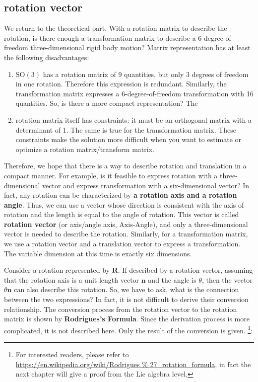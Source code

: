 \subsection{rotation vector}

We return to the theoretical part. With a rotation matrix to describe the rotation, is there enough a transformation matrix to describe a 6-degree-of-freedom three-dimensional rigid body motion? Matrix representation has at least the following disadvantages:

\begin{enumerate}
	\item  $ \mathrm {SO}( 3 ) $ has a rotation matrix of 9 quantities, but only 3 degrees of freedom in one rotation. Therefore this expression is redundant. Similarly, the transformation matrix expresses a 6-degree-of-freedom transformation with 16 quantities. So, is there a more compact representation?
	The \item rotation matrix itself has constraints: it must be an orthogonal matrix with a determinant of 1. The same is true for the transformation matrix. These constraints make the solution more difficult when you want to estimate or optimize a rotation matrix/transform matrix.
\end{enumerate}

Therefore, we hope that there is a way to describe rotation and translation in a compact manner. For example, is it feasible to express rotation with a three-dimensional vector and express transformation with a six-dimensional vector? In fact, any rotation can be characterized by \textbf {a rotation axis and a rotation angle}. Thus, we can use a vector whose direction is consistent with the axis of rotation and the length is equal to the angle of rotation. This vector is called \textbf {rotation vector} (or axis/angle axis, Axis-Angle), and only a three-dimensional vector is needed to describe the rotation. Similarly, for a transformation matrix, we use a rotation vector and a translation vector to express a transformation. The variable dimension at this time is exactly six dimensions.

Consider a rotation represented by $ \bm{R} $. If described by a rotation vector, assuming that the rotation axis is a unit length vector $ \bm{n} $ and the angle is $ \theta $, then the vector $ \theta \bm{n} $ can also describe this rotation. So, we have to ask, what is the connection between the two expressions? In fact, it is not difficult to derive their conversion relationship. The conversion process from the rotation vector to the rotation matrix is shown by \textbf{Rodrigues's Formula}. Since the derivation process is more complicated, it is not described here. Only the result of the conversion is given. \footnote{For interested readers, please refer to \url{https://en.wikipedia.org/wiki/Rodrigues \% 27_rotation_formula}, in fact the next chapter will give a proof from the Lie algebra level. }:

